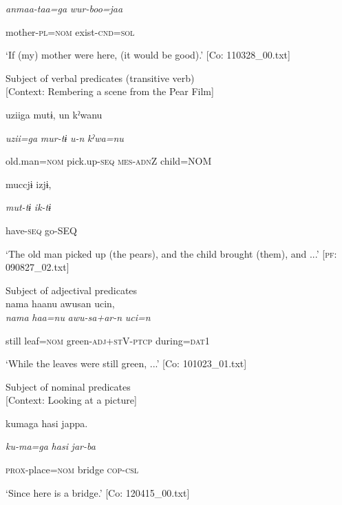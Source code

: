       \textit{anmaa-taa=ga}  \textit{wur-boo=jaa}

      mother-\textsc{pl}=\textsc{nom}  exist-\textsc{cnd}=\textsc{sol}

\glt ‘If (my) mother were here, (it would be good).’ [Co: 110328\_00.txt]
\z

 \ex Subject of verbal predicates (transitive verb)\\{}
[Context: Rembering a scene from the Pear Film]

{\TM}
\gll uziiga  mutɨ,  un  kˀwanu

      \textit{uzii=ga}  \textit{mur-tɨ}  \textit{u-n}  \textit{kˀwa=nu}

      old.man=\textsc{nom}  pick.up-\textsc{seq}  \textsc{mes}-\textsc{adn}Z  child=NOM

      muccjɨ  izjɨ,

      \textit{mut-tɨ}  \textit{ik-tɨ}

      have-\textsc{seq}  go-SEQ

\glt ‘The old man picked up (the pears), and the child brought (them), and ...’ [\textsc{pf}: 090827\_02.txt]
\z

 \ex Subject of adjectival predicates\\
{\TM}
\gll  nama  haanu  awusan  ucin,\\

      \textit{nama}  \textit{haa=nu}  \textit{awu-sa+ar-n}  \textit{uci=n}

      still  leaf=\textsc{nom}  green-\textsc{adj}+\textsc{st}V-\textsc{ptcp}  during=\textsc{dat}1

\glt ‘While the leaves were still green, ...’ [Co: 101023\_01.txt]
\z

 \ex Subject of nominal predicates\\{}
[Context: Looking at a picture]

{\TM}
\gll kumaga  hasi  jappa.

      \textit{ku-ma=ga}  \textit{hasi}  \textit{jar-ba}

      \textsc{prox}-place=\textsc{nom}  bridge  \textsc{cop}-\textsc{csl}

\glt ‘Since here is a bridge.’ [Co: 120415\_00.txt]
\z

